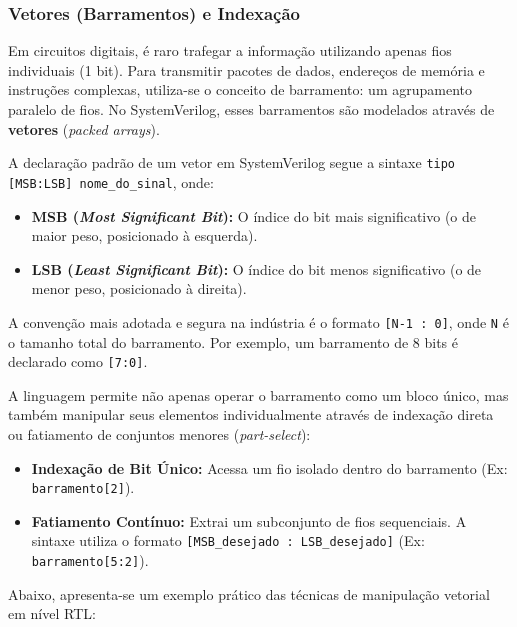 \documentclass[12pt,a4paper]{article}
\begin{document}
\subsubsection{Vetores (Barramentos) e Indexação}

Em circuitos digitais, é raro trafegar a informação utilizando apenas fios individuais (1 bit). Para transmitir pacotes de dados, endereços de memória e instruções complexas, utiliza-se o conceito de barramento: um agrupamento paralelo de fios. No SystemVerilog, esses barramentos são modelados através de \textbf{vetores} (\textit{packed arrays}).

A declaração padrão de um vetor em SystemVerilog segue a sintaxe \texttt{tipo [MSB:LSB] nome\_do\_sinal}, onde:
\begin{itemize}
    \item \textbf{MSB (\textit{Most Significant Bit}):} O índice do bit mais significativo (o de maior peso, posicionado à esquerda).
    \item \textbf{LSB (\textit{Least Significant Bit}):} O índice do bit menos significativo (o de menor peso, posicionado à direita).
\end{itemize}
A convenção mais adotada e segura na indústria é o formato \texttt{[N-1 : 0]}, onde \texttt{N} é o tamanho total do barramento. Por exemplo, um barramento de 8 bits é declarado como \texttt{[7:0]}.

A linguagem permite não apenas operar o barramento como um bloco único, mas também manipular seus elementos individualmente através de indexação direta ou fatiamento de conjuntos menores (\textit{part-select}):

\begin{itemize}
    \item \textbf{Indexação de Bit Único:} Acessa um fio isolado dentro do barramento (Ex: \texttt{barramento[2]}).
    \item \textbf{Fatiamento Contínuo:} Extrai um subconjunto de fios sequenciais. A sintaxe utiliza o formato \texttt{[MSB\_desejado : LSB\_desejado]} (Ex: \texttt{barramento[5:2]}).
\end{itemize}

Abaixo, apresenta-se um exemplo prático das técnicas de manipulação vetorial em nível RTL:
\end{document}

